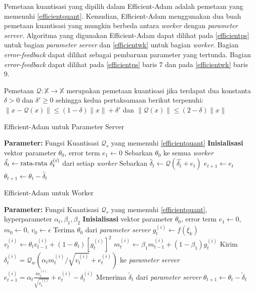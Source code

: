 Pemetaan kuantisasi yang dipilih dalam Efficient-Adam adalah pemetaan yang memenuhi \autoref{efficientquant}. Kemudian, Efficient-Adam menggunakan dua buah pemetaan kuantisasi yang mungkin berbeda antara \emph{worker} dengan \emph{parameter server}. Algoritma yang digunakan Efficient-Adam dapat dilihat pada \autoref{efficientps} untuk bagian \emph{parameter server} dan \autoref{efficientwk} untuk bagian \emph{worker}. Bagian \emph{error-feedback} dapat dilihat sebagai pembaruan parameter yang tertunda. Bagian \emph{error-feedback} dapat dilihat pada \autoref{efficientps} baris 7 dan pada \autoref{efficientwk} baris 9.

\begin{definition}
  \label{efficientquant}
  Pemetaan $\mathcal{Q}: \mathbb{X} \to \mathbb{X}$ merupakan pemetaan kuantisasi jika terdapat dua konstanta $\delta > 0$ dan $\delta' \geq 0$ sehingga kedua pertaksamaan berikut terpenuhi: $\|x-\mathcal{Q}(x)\| \leq (1-\delta)\|x\| + \delta'$ dan $\|\mathcal{Q}(x)\| \leq (2-\delta)\|x\|$
\end{definition}

\begin{algorithm}[H]
  \caption{Efficient-Adam untuk Parameter Server}\label{efficientps}
  \begin{algorithmic}[1]
    \State \textbf{Parameter:} Fungsi Kuantisasi $\mathcal{Q}_s$ yang memenuhi \autoref{efficientquant}
    \State \textbf{Inisialisasi} vektor parameter $\theta_0$, error term $e_1 \gets 0$
    \State Sebarkan $\theta_0$ ke semua \textit{worker}
    \State $\hat{\delta_t} \gets \textnormal{rata-rata } \delta_t^{(i)}$ dari setiap \textit{worker}
    \State Sebarkan $\tilde{\delta_t} \gets \mathcal{Q}(\hat{\delta_t} + e_t)$
    \State $e_{t+1} \gets e_{t}$
    \State $\theta_{t+1} \gets \theta_t - \tilde{\delta_t}$
    \EndFor
  \end{algorithmic}
\end{algorithm}

\begin{algorithm}[H]
  \caption{Efficient-Adam untuk Worker}\label{efficientwk}
  \begin{algorithmic}[1]
    \State \textbf{Parameter:} Fungsi Kuantisasi $\mathcal{Q}_s$ yang memenuhi \autoref{efficientquant}, hyperparameter $\alpha_t, \beta_1, \beta_2$
    \State \textbf{Inisialisasi} vektor parameter $\theta_0$, error term $e_1 \gets 0$, $m_0 \gets 0$, $v_0 \gets \epsilon$
    \State Terima $\theta_0$ dari \emph{parameter server}
    \State $g_t^{(i)} \gets f(\xi_k)$
    \State $v_t^{(i)} \gets \theta_t v_{t-1}^{(i)} + (1-\theta_t)[g_t^{(i)}]^2$
    \State $m_t^{(i)} \gets \beta_1 m_{t-1}^{(i)} + (1 - \beta_1)g_t^{(i)}$
    \State Kirim $\delta_t^{(i)} = \mathcal{Q}_w(\alpha_t m_t^{(i)} / \sqrt{v_t^{(i)}} + e_t^{(i)})$ ke \emph{parameter server}
    \State $e_{t+1}^{(i)} = \alpha_t \frac{m_t^{(i)}}{\sqrt{v_t^{(i)}}} + e_t^{(i)} - \delta_t^{(i)}$
    \State Menerima $\tilde{\delta}_t$ dari \emph{parameter server}
    \State $\theta_{t+1} \gets \theta_t - \tilde{\delta}_t$
    \EndFor
  \end{algorithmic}
\end{algorithm}
